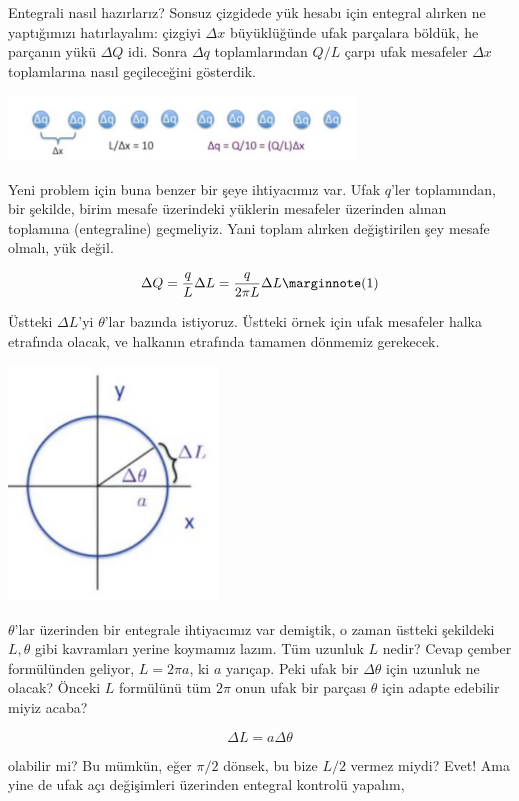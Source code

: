 \documentclass[12pt,fleqn]{article}\usepackage{../../common}
\begin{document}
Entegrali nasıl hazırlarız? Sonsuz çizgidede yük hesabı için entegral alırken ne
yaptığımızı hatırlayalım: çizgiyi $\Delta x$ büyüklüğünde ufak parçalara böldük,
he parçanın yükü $\Delta Q$ idi. Sonra $\Delta q$ toplamlarından $Q/L$ çarpı
ufak mesafeler $\Delta x$ toplamlarına nasıl geçileceğini gösterdik. 

\includegraphics[width=25em]{06_06.jpg}

Yeni problem için buna benzer bir şeye ihtiyacımız var. Ufak $q$'ler
toplamından, bir şekilde, birim mesafe üzerindeki yüklerin mesafeler üzerinden
alınan toplamına (entegraline) geçmeliyiz. Yani toplam alırken değiştirilen şey
mesafe olmalı, yük değil.

$$
\Delta Q = \frac{q}{L}\Delta L = \frac{q}{2\pi L}\Delta L \mlabel{1}
$$

Üstteki $\Delta L$'yi $\theta$'lar bazında istiyoruz.  Üstteki örnek için ufak
mesafeler halka etrafında olacak, ve halkanın etrafında tamamen dönmemiz
gerekecek.

\includegraphics[width=15em]{06_07.jpg}

$\theta$'lar üzerinden bir entegrale ihtiyacımız var demiştik, o zaman üstteki
şekildeki $L,\theta$ gibi kavramları yerine koymamız lazım. Tüm uzunluk $L$
nedir? Cevap çember formülünden geliyor, $L = 2\pi a$, ki $a$ yarıçap. Peki
ufak bir $\Delta \theta$ için uzunluk ne olacak? Önceki $L$ formülünü tüm $2\pi$
onun ufak bir parçası $\theta$ için adapte edebilir miyiz acaba?

$$
\Delta L = a \Delta \theta
$$

olabilir mi? Bu mümkün, eğer $\pi/2$ dönsek, bu bize $L/2$ vermez miydi? Evet!
Ama yine de ufak açı değişimleri üzerinden entegral kontrolü yapalım,
\end{document}

